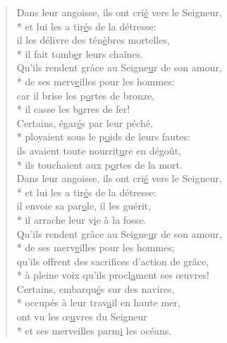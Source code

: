 \begin{verse}
Dans leur angoisse, ils ont cri\underline{é} vers le Seigneur, \\*
et lui les a tir\underline{é}s de la détresse: \\
il les délivre des tén\underline{è}bres mortelles, \\*
il fait tomb\underline{e}r leurs chaînes. \\

Qu’ils rendent grâce au Seigne\underline{u}r de son amour, \\*
de ses merv\underline{e}illes pour les hommes: \\
car il brise les p\underline{o}rtes de bronze, \\*
il casse les b\underline{a}rres de fer! \\

Certains, égar\underline{é}s par leur péché, \\*
ployaient sous le p\underline{o}ids de leurs fautes: \\
ils avaient toute nourrit\underline{u}re en dégoût, \\*
ils touchaient aux p\underline{o}rtes de la mort. \\

Dans leur angoisse, ils ont cri\underline{é} vers le Seigneur, \\*
et lui les a tir\underline{é}s de la détresse: \\
il envoie sa par\underline{o}le, il les guérit, \\*
il arrache leur v\underline{i}e à la fosse. \\

Qu’ils rendent grâce au Seigne\underline{u}r de son amour, \\*
de ses merv\underline{e}illes pour les hommes; \\
qu’ils offrent des sacrif\underline{i}ces d’action de grâce, \\*
à pleine voix qu’ils procl\underline{a}ment ses œuvres! \\

Certains, embarqu\underline{é}s sur des navires, \\*
occupés à leur trav\underline{a}il en haute mer, \\
ont vu les œ\underline{u}vres du Seigneur \\*
et ses merveilles parm\underline{i} les océans. \\


\end{verse}
